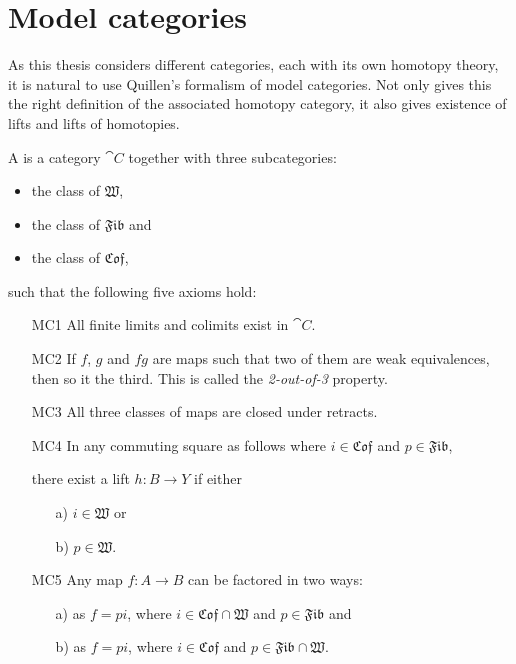
\chapter{Model categories}
\label{sec:model_categories}

As this thesis considers different categories, each with its own homotopy theory, it is natural to use Quillen's formalism of model categories. Not only gives this the right definition of the associated homotopy category, it also gives existence of lifts and lifts of homotopies.

\newcommand{\W}{\mathfrak{W}}
\newcommand{\Fib}{\mathfrak{Fib}}
\newcommand{\Cof}{\mathfrak{Cof}}

\begin{definition}
	A  is a category $\cat{C}$ together with three subcategories:
	\begin{itemize}
		\item the class of  $\W$,
		\item the class of  $\Fib$ and
		\item the class of  $\Cof$,
	\end{itemize}
	such that the following five axioms hold:
	\begin{itemize}
		\item[MC1] All finite limits and colimits exist in $\cat{C}$.
		\item[MC2] If $f$, $g$ and $fg$ are maps such that two of them are weak equivalences, then so it the third. This is called the \emph{2-out-of-3} property.
		\item[MC3] All three classes of maps are closed under retracts.
		\item[MC4] In any commuting square as follows where $i \in \Cof$ and $p \in \Fib$,

			there exist a lift $h: B \to Y$ if either 
			\begin{itemize}
				\item[a)] $i \in \W$ or
				\item[b)] $p \in \W$.
			\end{itemize}
		\item[MC5] Any map $f : A \to B$ can be factored in two ways:
			\begin{itemize}
				\item[a)] as $f = pi$, where $i \in \Cof \cap \W$ and $p \in \Fib$ and
				\item[b)] as $f = pi$, where $i \in \Cof$ and $p \in \Fib \cap \W$.
			\end{itemize}
	\end{itemize}
\end{definition}

